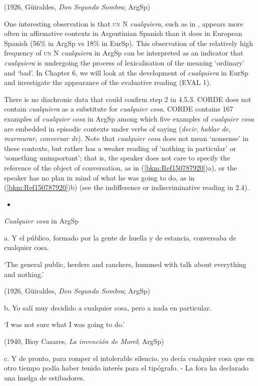 {    (1926, Güiraldes,} {\textit{Don Segundo Sombra}}{; ArgSp)}

One interesting observation is that \textsc{un} N \textit{cualquiera}, such as in , appears more often in affirmative contexts in Argentinian Spanish than it does in European Spanish (56\% in ArgSp vs 18\% in EurSp). This observation of the relatively high frequency of \textsc{un} N \textit{cualquiera} in ArgSp can be interpreted as an indicator that \textit{cualquiera} is undergoing the process of lexicalisation of the meaning ‘ordinary’ and ‘bad’. In Chapter 6, we will look at the development of \textit{cualquiera} in EurSp and investigate the appearance of the evaluative reading (EVAL 1).

  There is no diachronic data that could confirm step 2 in 4.5.3. CORDE does not contain \textit{cualquiera} as a substitute for \textit{cualquier cosa}. CORDE contains 167 examples of \textit{cualquier cosa} in ArgSp among which five examples of \textit{cualquier cosa} are embedded in episodic contexts under verbs of saying (\textit{decir}, \textit{hablar de, murmurar, conversar de}). Note that \textit{cualquier cosa} does not mean ‘nonsense’ in these contexts, but rather has a weaker reading of ‘nothing in particular’ or ‘something unimportant’; that is, the speaker does not care to specify the reference of the object of conversation, as in (\ref{bkm:Ref150787920})a), or the speaker has no plan in mind of what he was going to do, as in (\ref{bkm:Ref150787920})b) (see the indifference or indiscriminative reading in 2.4).

\begin{itemize}
\item \end{itemize}

  \textit{Cualquier cosa} in ArgSp

  a.  Y el público, formado por la gente de huella y de estancia, conversaba de cualquier cosa.

    ‘The general public, herders and ranchers, hummed with talk about everything and nothing.’

    (1926, Güiraldes, \textit{Don Segundo Sombra}; ArgSp)

  b.  Yo salí muy decidido a cualquier cosa, pero a nada en particular.

    ‘I was not sure what I was going to do.’

    (1940, Bioy Casares, \textit{La invención de Morel}; ArgSp)

  c.  Y de pronto, para romper el intolerable silencio, yo decía cualquier cosa que en otro tiempo podía haber tenido interés para el tipógrafo. - La fora ha declarado una huelga de estibadores.


